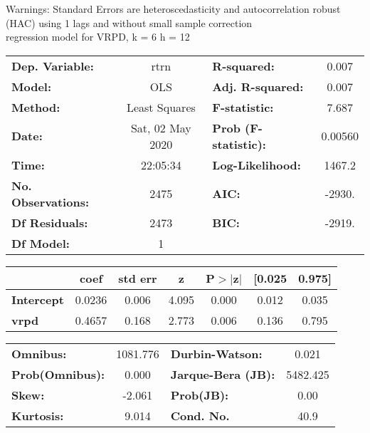 Warnings: \newline
 [1] Standard Errors are heteroscedasticity and autocorrelation robust (HAC) using 1 lags and without small sample correction\\ 

regression model for VRPD, k = 6 h = 12\begin{center}
\begin{tabular}{lclc}
\toprule
\textbf{Dep. Variable:}    &       rtrn       & \textbf{  R-squared:         } &     0.007   \\
\textbf{Model:}            &       OLS        & \textbf{  Adj. R-squared:    } &     0.007   \\
\textbf{Method:}           &  Least Squares   & \textbf{  F-statistic:       } &     7.687   \\
\textbf{Date:}             & Sat, 02 May 2020 & \textbf{  Prob (F-statistic):} &  0.00560    \\
\textbf{Time:}             &     22:05:34     & \textbf{  Log-Likelihood:    } &    1467.2   \\
\textbf{No. Observations:} &        2475      & \textbf{  AIC:               } &    -2930.   \\
\textbf{Df Residuals:}     &        2473      & \textbf{  BIC:               } &    -2919.   \\
\textbf{Df Model:}         &           1      & \textbf{                     } &             \\
\bottomrule
\end{tabular}
\begin{tabular}{lcccccc}
                   & \textbf{coef} & \textbf{std err} & \textbf{z} & \textbf{P$> |$z$|$} & \textbf{[0.025} & \textbf{0.975]}  \\
\midrule
\textbf{Intercept} &       0.0236  &        0.006     &     4.095  &         0.000        &        0.012    &        0.035     \\
\textbf{vrpd}      &       0.4657  &        0.168     &     2.773  &         0.006        &        0.136    &        0.795     \\
\bottomrule
\end{tabular}
\begin{tabular}{lclc}
\textbf{Omnibus:}       & 1081.776 & \textbf{  Durbin-Watson:     } &    0.021  \\
\textbf{Prob(Omnibus):} &   0.000  & \textbf{  Jarque-Bera (JB):  } & 5482.425  \\
\textbf{Skew:}          &  -2.061  & \textbf{  Prob(JB):          } &     0.00  \\
\textbf{Kurtosis:}      &   9.014  & \textbf{  Cond. No.          } &     40.9  \\
\bottomrule
\end{tabular}
\end{center}

